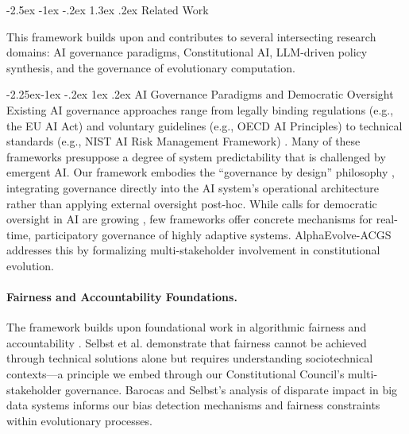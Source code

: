 \documentclass[manuscript,screen,review,anonymous,9pt]{acmart}
\makeatletter
\renewcommand\section{\@startsection{section}{1}{\z@}%
  {-2.5ex \@plus -1ex \@minus -.2ex}%
  {1.3ex \@plus.2ex}%
  {\normalfont\Large\bfseries}}
\renewcommand\subsection{\@startsection{subsection}{2}{\z@}%
  {-2.25ex\@plus -1ex \@minus -.2ex}%
  {1ex \@plus .2ex}%
  {\normalfont\large\bfseries}}
\makeatother
\begin{document}
\section{Related Work}
\label{sec:related_work}

This framework builds upon and contributes to several intersecting research domains: AI governance paradigms, Constitutional AI, LLM-driven policy synthesis, and the governance of evolutionary computation.

\subsection{AI Governance Paradigms and Democratic Oversight}
Existing AI governance approaches range from legally binding regulations (e.g., the EU AI Act) and voluntary guidelines (e.g., OECD AI Principles) to technical standards (e.g., NIST AI Risk Management Framework) \cite{Wynants2025ETHICAL, WorldBank2024AIGovernance, CambridgeUP2024CorporateGovernance}. Many of these frameworks presuppose a degree of system predictability that is challenged by emergent AI. Our framework embodies the ``governance by design'' philosophy \cite{Engin2025AdaptiveAIGovernance}, integrating governance directly into the AI system's operational architecture rather than applying external oversight post-hoc. While calls for democratic oversight in AI are growing \cite{Hwang2025PublicCAI}, few frameworks offer concrete mechanisms for real-time, participatory governance of highly adaptive systems. AlphaEvolve-ACGS addresses this by formalizing multi-stakeholder involvement in constitutional evolution.

\paragraph{Fairness and Accountability Foundations.} The framework builds upon foundational work in algorithmic fairness and accountability \cite{Selbst2019FairnessAccountability, Barocas2016BigDataDisparate}. Selbst et al. demonstrate that fairness cannot be achieved through technical solutions alone but requires understanding sociotechnical contexts---a principle we embed through our Constitutional Council's multi-stakeholder governance. Barocas and Selbst's analysis of disparate impact in big data systems informs our bias detection mechanisms and fairness constraints within evolutionary processes.
\end{document}
